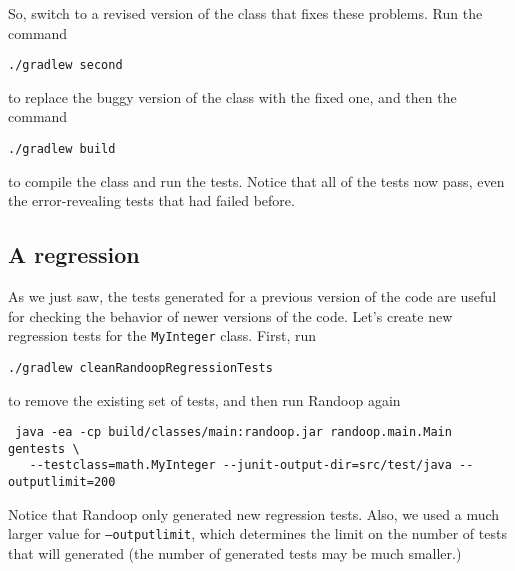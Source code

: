 \documentclass[11pt, oneside]{article} %
\newcommand{\code}[1]{{\texttt{#1}}}
\newcommand{\cmd}[1]{{\texttt{#1}}}
\begin{document}
So, switch to a revised version of the class that fixes these problems.
Run the command
\begin{verbatim}
./gradlew second
\end{verbatim}
to replace the buggy version of the class with the fixed one, and then the command
\begin{verbatim}
./gradlew build
\end{verbatim}
to compile the class and run the tests. 
Notice that all of the tests now pass, even the error-revealing tests that had failed before.

\subsection{A regression}

As we just saw, the tests generated for a previous version of the code are useful for checking the behavior of newer versions of the code.
Let's create new regression tests for the \code{MyInteger} class.
First, run
\begin{verbatim}
./gradlew cleanRandoopRegressionTests
\end{verbatim}
to remove the existing set of tests, and then run Randoop again
\begin{verbatim}
 java -ea -cp build/classes/main:randoop.jar randoop.main.Main gentests \
   --testclass=math.MyInteger --junit-output-dir=src/test/java --outputlimit=200
\end{verbatim}
Notice that Randoop only generated new regression tests.
Also, we used a much larger value for \cmd{--outputlimit}, which determines the limit on the number of tests that will generated (the number of generated tests may be much smaller.)
\end{document}
